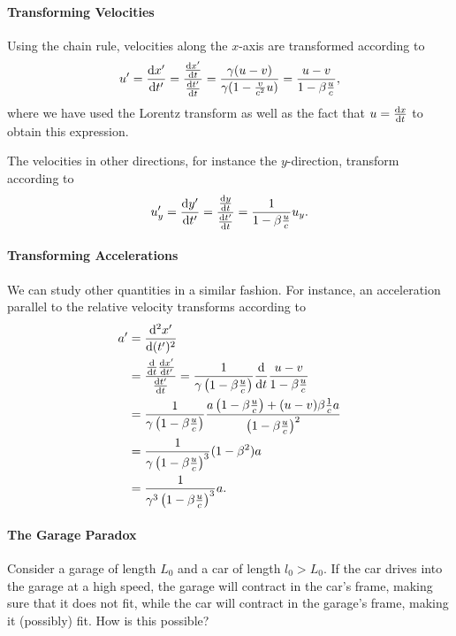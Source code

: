 \paragraph{Transforming Velocities}
Using the chain rule, velocities along the $x$-axis are transformed according to
\begin{align*}
	u' = \dv{x'}{t'} = \frac{\dv{x'}{t}}{\dv{t'}{t}} = \frac{\gamma(u - v)}{\gamma(1 - \frac{v}{c^{2}}u)} = \frac{u - v}{1 - \beta\frac{u}{c}},
\end{align*}
where we have used the Lorentz transform as well as the fact that $u = \dv{x}{t}$ to obtain this expression.

The velocities in other directions, for instance the $y$-direction, transform according to
\begin{align*}
	u_{y}' = \dv{y'}{t'} = \frac{\dv{y}{t}}{\dv{t'}{t}} = \frac{1}{1 - \beta\frac{u}{c}}u_{y}.
\end{align*}

\paragraph{Transforming Accelerations}
We can study other quantities in a similar fashion. For instance, an acceleration parallel to the relative velocity transforms according to
\begin{align*}
	a^{\prime} &= \dv[2]{x^{\prime}}{(t^{\prime})} \\
	    &= \frac{\dv{t}\dv{x^{\prime}}{t^{\prime}}}{\dv{t^{\prime}}{t}} = \frac{1}{\gamma\left(1 - \beta\frac{u}{c}\right)}\dv{t}\frac{u - v}{1 - \beta\frac{u}{c}} \\
	    &= \frac{1}{\gamma\left(1 - \beta\frac{u}{c}\right)}\frac{a\left(1 - \beta\frac{u}{c}\right) + (u - v)\beta\frac{1}{c}a}{\left(1 - \beta\frac{u}{c}\right)^{2}} \\
	    &= \frac{1}{\gamma\left(1 - \beta\frac{u}{c}\right)^{3}}(1 - \beta^{2})a \\
	    &= \frac{1}{\gamma^{3}\left(1 - \beta\frac{u}{c}\right)^{3}}a.
\end{align*}

\paragraph{The Garage Paradox}
Consider a garage of length $L_{0}$ and a car of length $l_{0} > L_{0}$. If the car drives into the garage at a high speed, the garage will contract in the car's frame, making sure that it does not fit, while the car will contract in the garage's frame, making it (possibly) fit. How is this possible?

